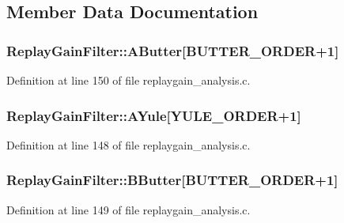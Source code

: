 \subsection{Member Data Documentation}
\subsubsection[{\texorpdfstring{A\+Butter}{AButter}}]{ Replay\+Gain\+Filter\+::\+A\+Butter\mbox{[}{\bf B\+U\+T\+T\+E\+R\+\_\+\+O\+R\+D\+ER}+1\mbox{]}}\hypertarget{struct_replay_gain_filter_aa759f17fb0e2cb02c3b3a5cc11a11a0f}{}\label{struct_replay_gain_filter_aa759f17fb0e2cb02c3b3a5cc11a11a0f}


Definition at line 150 of file replaygain\+\_\+analysis.\+c.

\subsubsection[{\texorpdfstring{A\+Yule}{AYule}}]{ Replay\+Gain\+Filter\+::\+A\+Yule\mbox{[}{\bf Y\+U\+L\+E\+\_\+\+O\+R\+D\+ER}+1\mbox{]}}\hypertarget{struct_replay_gain_filter_a308645ad3bbfc0444f1f1c4da997439e}{}\label{struct_replay_gain_filter_a308645ad3bbfc0444f1f1c4da997439e}


Definition at line 148 of file replaygain\+\_\+analysis.\+c.

\subsubsection[{\texorpdfstring{B\+Butter}{BButter}}]{ Replay\+Gain\+Filter\+::\+B\+Butter\mbox{[}{\bf B\+U\+T\+T\+E\+R\+\_\+\+O\+R\+D\+ER}+1\mbox{]}}\hypertarget{struct_replay_gain_filter_abcf3ff4d38499794f51b6c074cf7258d}{}\label{struct_replay_gain_filter_abcf3ff4d38499794f51b6c074cf7258d}


Definition at line 149 of file replaygain\+\_\+analysis.\+c.

